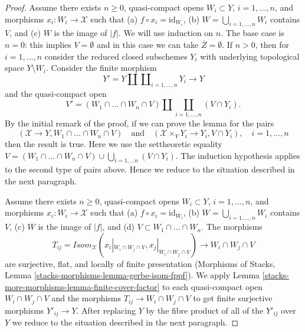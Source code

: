 \begin{proof}
\medskip\noindent
Assume there exists $n \geq 0$, quasi-compact opens
$W_i \subset Y$, $i = 1, \ldots, n$, and
morphisms $x_i : W_i \to \mathcal{X}$ such that
(a) $f \circ x_i = \text{id}_{W_i}$,
(b) $W = \bigcup_{i = 1, \ldots, n} W_i$ contains $V$, and
(c) $W$ is the image of $|f|$.
We will use induction on $n$. The base case is $n = 0$: this
implies $V = \emptyset$ and in this case we can take
$\overline{Z} = \emptyset$.
If $n > 0$, then for $i = 1, \ldots, n$
consider the reduced closed subschemes
$Y_i$ with underlying topological space
$Y \setminus W_i$. Consider the finite morphism
$$
Y' = Y \amalg \coprod\nolimits_{i = 1, \ldots, n} Y_i \longrightarrow Y
$$
and the quasi-compact open
$$
V' = (W_1 \cap \ldots \cap W_n \cap V) \amalg
\coprod_{i = 1, \ldots, n} (V \cap Y_i).
$$
By the initial remark of the proof, if we can prove the lemma for the pairs
$$
(\mathcal{X} \to Y, W_1 \cap \ldots \cap W_n \cap V)
\quad\text{and}\quad
(\mathcal{X} \times_Y Y_i \to Y_i, V \cap Y_i),\quad
i = 1, \ldots, n
$$
then the result is true. Here we use the settheoretic equality
$V = (W_1 \cap \ldots \cap W_n \cap V) \cup
\bigcup\nolimits_{i = 1, \ldots n} (V \cap Y_i)$.
The induction hypothesis applies to the second type of
pairs above. Hence we reduce to the situation described in
the next paragraph.

\medskip\noindent
Assume there exists $n \geq 0$, quasi-compact opens
$W_i \subset Y$, $i = 1, \ldots, n$, and
morphisms $x_i : W_i \to \mathcal{X}$ such that
(a) $f \circ x_i = \text{id}_{W_i}$,
(b) $W = \bigcup_{i = 1, \ldots, n} W_i$ contains $V$,
(c) $W$ is the image of $|f|$, and
(d) $V \subset W_1 \cap \ldots \cap W_n$.
The morphisms
$$
T_{ij} = \mathit{Isom}_\mathcal{X}(x_i|_{W_i \cap W_j \cap V},
x_j|_{W_i \cap W_j \cap V}) \longrightarrow W_i \cap W_j \cap V
$$
are surjective, flat, and locally of finite presentation
(Morphisms of Stacks, Lemma \ref{stacks-morphisms-lemma-gerbe-isom-fppf}).
We apply Lemma \ref{stacks-more-morphisms-lemma-finite-cover-factor}
to each quasi-compact open $W_i \cap W_j \cap V$ and the morphisms
$T_{ij} \to W_i \cap W_j \cap V$ to get finite surjective morphisms
$Y'_{ij} \to Y$. After replacing $Y$ by the fibre product of all
of the $Y'_{ij}$ over $Y$ we reduce to the situation described
in the next paragraph.


\end{proof}
